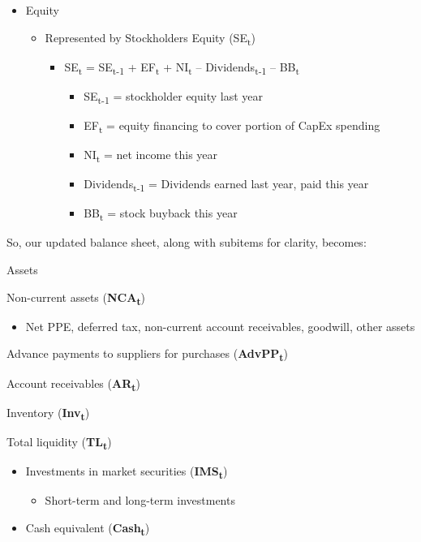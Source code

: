 \documentclass[12pt,a4paper]{article}
\begin{document}
\begin{itemize}
\item
  Equity

  \begin{itemize}
  \item
    Represented by Stockholders Equity (SE\textsubscript{t})

    \begin{itemize}
    \item
      SE\textsubscript{t} = SE\textsubscript{t-1} + EF\textsubscript{t}
      + NI\textsubscript{t} -- Dividends\textsubscript{t-1} --
      BB\textsubscript{t}

      \begin{itemize}
      \item
        SE\textsubscript{t-1} = stockholder equity last year
      \item
        EF\textsubscript{t} = equity financing to cover portion of CapEx
        spending
      \item
        NI\textsubscript{t} = net income this year
      \item
        Dividends\textsubscript{t-1} = Dividends earned last year, paid
        this year
      \item
        BB\textsubscript{t} = stock buyback this year
      \end{itemize}
    \end{itemize}
  \end{itemize}
\end{itemize}

So, our updated balance sheet, along with subitems for clarity, becomes:

Assets

Non-current assets (\textbf{NCA\textsubscript{t}})

\begin{itemize}
\item
  Net PPE, deferred tax, non-current account receivables, goodwill,
  other assets
\end{itemize}

Advance payments to suppliers for purchases
(\textbf{AdvPP\textsubscript{t}})

Account receivables (\textbf{AR\textsubscript{t}})

Inventory (\textbf{Inv\textsubscript{t}})

Total liquidity (\textbf{TL\textsubscript{t}})

\begin{itemize}
\item
  Investments in market securities (\textbf{IMS\textsubscript{t}})

  \begin{itemize}
  \item
    Short-term and long-term investments
  \end{itemize}
\item
  Cash equivalent (\textbf{Cash\textsubscript{t}})
\end{itemize}
\end{document}
